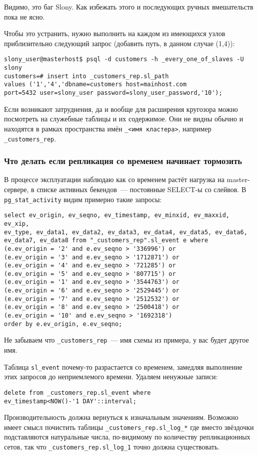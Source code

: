 Видимо, это баг Slony. Как избежать этого и последующих ручных вмешательств пока не ясно.

Чтобы это устранить, нужно выполнить на каждом из имеющихся узлов приблизительно следующий запрос (добавить путь, в данном случае (1,4)):

\begin{lstlisting}[label=lst:slony18,caption=Устранение неисправностей]
slony_user@masterhost$ psql -d customers -h _every_one_of_slaves -U slony
customers=# insert into _customers_rep.sl_path
values ('1','4','dbname=customers host=mainhost.com
port=5432 user=slony_user password=slony_user_password,'10');
\end{lstlisting}

Если возникают затруднения, да и вообще для расширения кругозора можно посмотреть на служебные таблицы и их содержимое. Они не видны обычно и находятся в рамках пространства имён \lstinline!_<имя кластера>!, например \lstinline!_customers_rep!.

\subsubsection{Что делать если репликация со временем начинает тормозить}

В процессе эксплуатации наблюдаю как со временем растёт нагрузка на master-сервере, в списке активных бекендов~--- постоянные SELECT-ы со слейвов. В \lstinline!pg_stat_activity! видим примерно такие запросы:

\begin{lstlisting}[label=lst:slony19,caption=Устранение неисправностей]
select ev_origin, ev_seqno, ev_timestamp, ev_minxid, ev_maxxid, ev_xip,
ev_type, ev_data1, ev_data2, ev_data3, ev_data4, ev_data5, ev_data6,
ev_data7, ev_data8 from "_customers_rep".sl_event e where
(e.ev_origin = '2' and e.ev_seqno > '336996') or
(e.ev_origin = '3' and e.ev_seqno > '1712871') or
(e.ev_origin = '4' and e.ev_seqno > '721285') or
(e.ev_origin = '5' and e.ev_seqno > '807715') or
(e.ev_origin = '1' and e.ev_seqno > '3544763') or
(e.ev_origin = '6' and e.ev_seqno > '2529445') or
(e.ev_origin = '7' and e.ev_seqno > '2512532') or
(e.ev_origin = '8' and e.ev_seqno > '2500418') or
(e.ev_origin = '10' and e.ev_seqno > '1692318')
order by e.ev_origin, e.ev_seqno;
\end{lstlisting}

Не забываем что \lstinline!_customers_rep!~--- имя схемы из примера, у вас будет другое имя.

Таблица \lstinline!sl_event! почему-то разрастается со временем, замедляя выполнение этих запросов до неприемлемого времени. Удаляем ненужные записи:

\begin{lstlisting}[label=lst:slony20,caption=Устранение неисправностей]
delete from _customers_rep.sl_event where
ev_timestamp<NOW()-'1 DAY'::interval;
\end{lstlisting}

Производительность должна вернуться к изначальным значениям. Возможно имеет смысл почистить таблицы \lstinline!_customers_rep.sl_log_*! где вместо звёздочки подставляются натуральные числа, по-видимому по количеству репликационных сетов, так что \lstinline!_customers_rep.sl_log_1! точно должна существовать.